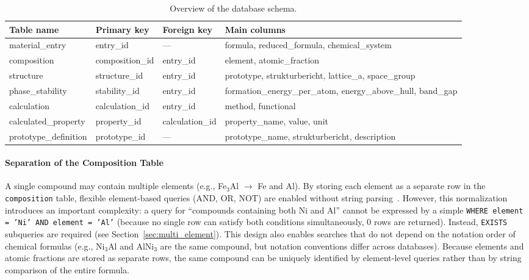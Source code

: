 \documentclass[5p,twocolumn]{elsarticle}
\begin{document}
\begin{table}[htbp]
  \centering
  \caption{Overview of the database schema.}
  \label{tab:schema}
  \small
  \begin{tabularx}{\textwidth}{lllX}
    \toprule
    Table name & Primary key & Foreign key & Main columns \\
    \midrule
    material\_entry & entry\_id & --- & formula, reduced\_formula, chemical\_system \\
    composition & composition\_id & entry\_id & element, atomic\_fraction \\
    structure & structure\_id & entry\_id & prototype, strukturbericht, lattice\_a, space\_group \\
    phase\_stability & stability\_id & entry\_id & formation\_energy\_per\_atom, energy\_above\_hull, band\_gap \\
    calculation & calculation\_id & entry\_id & method, functional \\
    calculated\_property & property\_id & calculation\_id & property\_name, value, unit \\
    prototype\_definition & prototype\_id & --- & prototype\_name, strukturbericht, description \\
    \bottomrule
  \end{tabularx}
\end{table}

\paragraph{Separation of the Composition Table}
A single compound may contain multiple elements (e.g., Fe$_3$Al $\to$ Fe and Al).
By storing each element as a separate row in the \texttt{composition} table,
flexible element-based queries (AND, OR, NOT) are enabled without string parsing~\citep{villars2004pauling}.
However, this normalization introduces an important complexity:
a query for “compounds containing both Ni and Al” cannot be expressed by a simple
\texttt{WHERE element = 'Ni' AND element = 'Al'}
(because no single row can satisfy both conditions simultaneously, 0 rows are returned).
Instead, \texttt{EXISTS} subqueries are required (see Section~\ref{sec:multi_element}).
This design also enables searches that do not depend on the notation order of chemical formulas
(e.g., Ni$_3$Al and AlNi$_3$ are the same compound, but notation conventions differ across
databases).
Because elements and atomic fractions are stored as separate rows, the same compound can be uniquely identified
by element-level queries rather than by string comparison of the entire formula.
\end{document}
